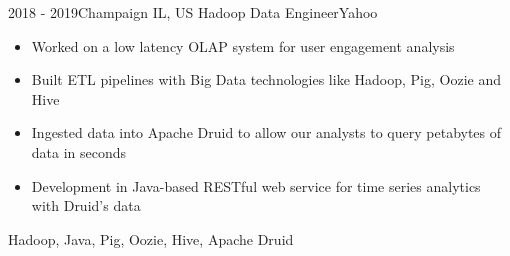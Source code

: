 \begin{experiences}
\emptySeparator

\experience
{2018 - 2019}{Champaign IL, US}
{Hadoop Data Engineer}{Yahoo}
{
    \begin{itemize}
    \item Worked on a low latency OLAP system for user engagement analysis
    \item Built ETL pipelines with Big Data technologies like Hadoop, Pig, Oozie and Hive
    \item Ingested data into Apache Druid to allow our analysts to query petabytes of data in seconds
    \item Development in Java-based RESTful web service for time series analytics with Druid's data
    \end{itemize}
}
{Hadoop, Java, Pig, Oozie, Hive, Apache Druid}

\end{experiences}